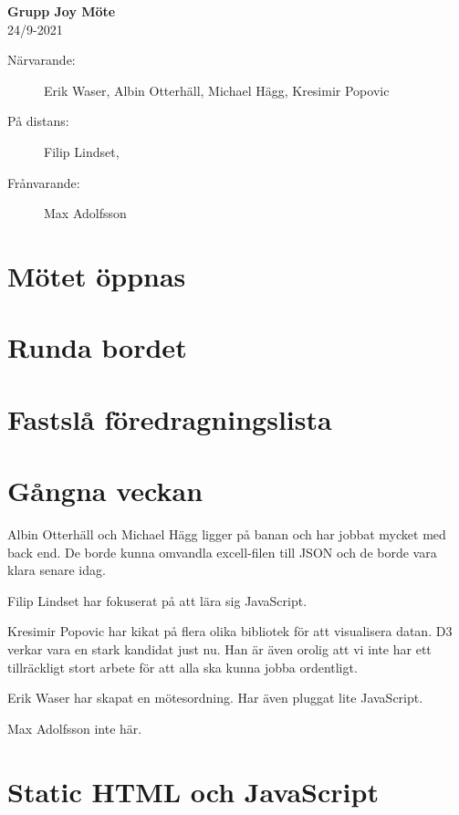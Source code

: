 \documentclass[9pt]{article}
\newcommand{\Waser}{Erik Waser\xspace}
\newcommand{\Slaget}{Albin Otterhäll\xspace}
\newcommand{\Max}{Max Adolfsson\xspace}
\newcommand{\Kim}{Michael Hägg\xspace}
\newcommand{\Algen}{Filip Lindset\xspace}
\newcommand{\Kres}{Kresimir Popovic\xspace}
\newcommand{\datum}{24/9-2021} %
\begin{document}
\begin{center}
    \Large{\textbf{Grupp Joy Möte}}\\
    \normalsize
    \datum \\ %
\end{center}

\begin{description} %
  \item [Närvarande:] \Waser, \Slaget, \Kim, \Kres
  \item [På distans:] \Algen, 
  \item [Frånvarande:] \Max
\end{description}

\section{Mötet öppnas}

\section{Runda bordet}

\section{Fastslå föredragningslista}

\section{Gångna veckan}
\Slaget och \Kim ligger på banan och har jobbat mycket med back end. De borde kunna omvandla excell-filen till JSON och de borde vara klara senare idag. 

\Algen har fokuserat på att lära sig JavaScript. 

\Kres har kikat på flera olika bibliotek för att visualisera datan. D3 verkar vara en stark kandidat just nu. 
Han är även orolig att vi inte har ett tillräckligt stort arbete för att alla ska kunna jobba ordentligt. 

\Waser har skapat en mötesordning. Har även pluggat lite JavaScript.  

\Max inte här. 

\section{Static HTML och JavaScript}
\end{document}
